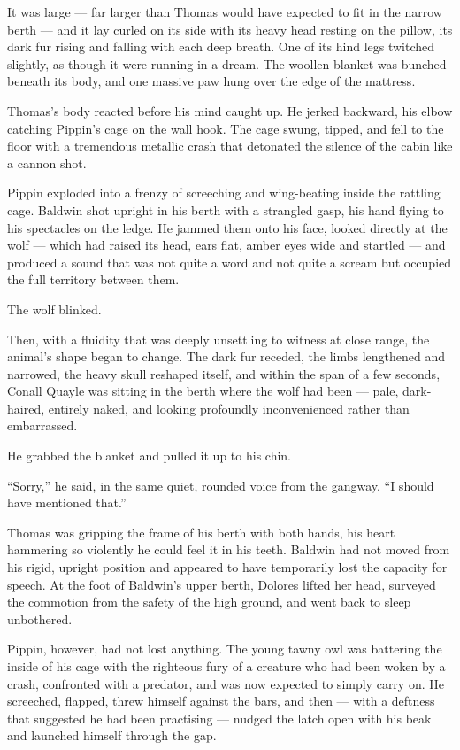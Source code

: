 It was large --- far larger than Thomas would have expected to fit in the narrow berth --- and it lay curled on its side with its heavy head resting on the pillow, its dark fur rising and falling with each deep breath. One of its hind legs twitched slightly, as though it were running in a dream. The woollen blanket was bunched beneath its body, and one massive paw hung over the edge of the mattress.

Thomas's body reacted before his mind caught up. He jerked backward, his elbow catching Pippin's cage on the wall hook. The cage swung, tipped, and fell to the floor with a tremendous metallic crash that detonated the silence of the cabin like a cannon shot.

Pippin exploded into a frenzy of screeching and wing-beating inside the rattling cage. Baldwin shot upright in his berth with a strangled gasp, his hand flying to his spectacles on the ledge. He jammed them onto his face, looked directly at the wolf --- which had raised its head, ears flat, amber eyes wide and startled --- and produced a sound that was not quite a word and not quite a scream but occupied the full territory between them.

The wolf blinked.

Then, with a fluidity that was deeply unsettling to witness at close range, the animal's shape began to change. The dark fur receded, the limbs lengthened and narrowed, the heavy skull reshaped itself, and within the span of a few seconds, Conall Quayle was sitting in the berth where the wolf had been --- pale, dark-haired, entirely naked, and looking profoundly inconvenienced rather than embarrassed.

He grabbed the blanket and pulled it up to his chin.

\enquote{Sorry,} he said, in the same quiet, rounded voice from the gangway. \enquote{I should have mentioned that.}

Thomas was gripping the frame of his berth with both hands, his heart hammering so violently he could feel it in his teeth. Baldwin had not moved from his rigid, upright position and appeared to have temporarily lost the capacity for speech. At the foot of Baldwin's upper berth, Dolores lifted her head, surveyed the commotion from the safety of the high ground, and went back to sleep unbothered.

Pippin, however, had not lost anything. The young tawny owl was battering the inside of his cage with the righteous fury of a creature who had been woken by a crash, confronted with a predator, and was now expected to simply carry on. He screeched, flapped, threw himself against the bars, and then --- with a deftness that suggested he had been practising --- nudged the latch open with his beak and launched himself through the gap.

